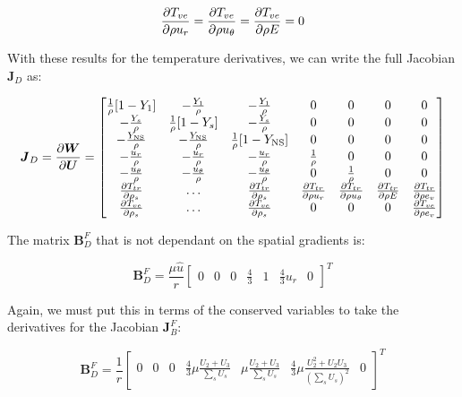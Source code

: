 \documentclass[10pt]{article}
\begin{document}
\begin{flushleft}
\begin{equation}
    \frac{\partial T_{ve}}{\partial \rho u_r} = \frac{\partial T_{ve}}{\partial \rho u_\theta} = \frac{\partial T_{ve}}{\partial \rho E} = 0
\end{equation}

With these results for the temperature derivatives, we can write the full Jacobian $\boldsymbol{J}_D$ as:

\begin{equation*}
    \boldsymbol{J}_D = \frac{\partial \boldsymbol{W}}{\partial \boldsymbol{U}} = \begin{bmatrix}
        \frac{1}{\rho} [1 - Y_1] & -\frac{Y_1}{\rho} & -\frac{Y_1}{\rho} & 0 & 0 & 0 & 0 \\
        -\frac{Y_s}{\rho} & \frac{1}{\rho} [1 - Y_s] & -\frac{Y_s}{\rho} & 0 & 0 & 0 & 0 \\
        -\frac{Y_\text{NS}}{\rho} & -\frac{Y_\text{NS}}{\rho} & \frac{1}{\rho} [1 - Y_\text{NS}] & 0 & 0 & 0 & 0 \\
        -\frac{u_r}{\rho} & -\frac{u_r}{\rho} & -\frac{u_r}{\rho} & \frac{1}{\rho} & 0 & 0 & 0 \\
        -\frac{u_\theta}{\rho} & -\frac{u_\theta}{\rho} & -\frac{u_\theta}{\rho} & 0 & \frac{1}{\rho} & 0 & 0 \\
        \frac{\partial T_{tr}}{\partial \rho_s} & \dots & \frac{\partial T_{tr}}{\partial \rho_s} & \frac{\partial T_{tr}}{\partial \rho u_r} & \frac{\partial T_{tr}}{\partial \rho u_\theta} & \frac{\partial T_{tr}}{\partial \rho E} & \frac{\partial T_{tr}}{\partial \rho e_v} \\
        \frac{\partial T_{ve}}{\partial \rho_s} & \dots & \frac{\partial T_{ve}}{\partial \rho_s} & 0 & 0 & 0 & \frac{\partial T_{ve}}{\partial \rho e_v}
    \end{bmatrix}
\end{equation*}

The matrix $\boldsymbol{B}_D^F$ that is not dependant on the spatial gradients is:

\begin{equation*}
    \boldsymbol{B}_D^F = \frac{\mu \hat{u}}{r}
    \begin{bmatrix}
        0 & 0 & 0 & \frac{4}{3} & 1 & \frac{4}{3} u_r & 0
    \end{bmatrix}^T
\end{equation*}

Again, we must put this in terms of the conserved variables to take the derivatives for the Jacobian $\boldsymbol{J}_B^F$:

\begin{equation*}
    \boldsymbol{B}_D^F = \frac{1}{r}
    \begin{bmatrix}
        0 & 0 & 0 & \frac{4}{3} \mu \frac{U_2 + U_3}{\sum_s U_s} & \mu \frac{U_2 + U_3}{\sum_s U_s} & \frac{4}{3} \mu \frac{U_2^2 + U_2 U_3}{(\sum_s U_s)^2} & 0
    \end{bmatrix}^T
\end{equation*}


\end{flushleft}
\end{document}
